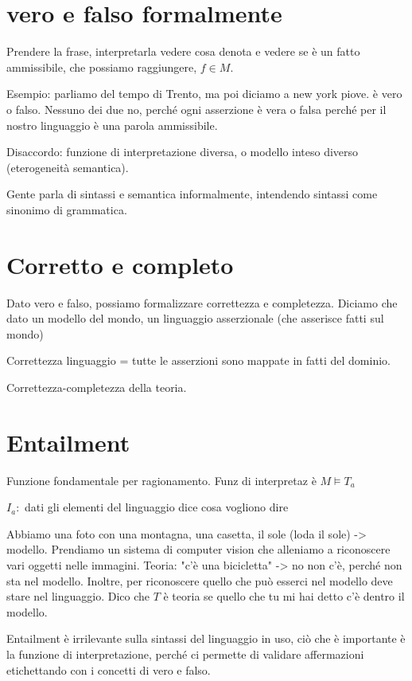 \section{vero e falso formalmente}
Prendere la frase, interpretarla vedere cosa denota e vedere se è un fatto
ammissibile, che possiamo raggiungere, $f \in M$.



Esempio: parliamo del tempo di Trento, ma poi diciamo a new york piove. è vero
o falso. Nessuno dei due no, perché ogni asserzione è vera o falsa perché per
il nostro linguaggio è una parola ammissibile.

Disaccordo: funzione di interpretazione diversa, o modello inteso diverso
(eterogeneità semantica).


Gente parla di sintassi e semantica informalmente, intendendo sintassi
come sinonimo di grammatica.

\section{Corretto e completo}
Dato vero e falso, possiamo formalizzare correttezza e completezza.
Diciamo che dato un modello del mondo, un linguaggio asserzionale (che asserisce fatti sul mondo)

Correttezza linguaggio = tutte le asserzioni sono mappate in fatti del dominio.


Correttezza-completezza della teoria.


\section{Entailment}
Funzione fondamentale per ragionamento. Funz di interpretaz è $M \vDash T_a$

$I_a:$ dati gli elementi del linguaggio dice cosa vogliono dire


Abbiamo una foto con una montagna, una casetta, il sole (loda il sole) -> modello.
Prendiamo un sistema di computer vision che alleniamo a riconoscere
vari oggetti nelle immagini.
Teoria: "c'è una bicicletta" -> no non c'è, perché non sta nel modello.
Inoltre, per riconoscere quello che può esserci nel modello deve stare
nel linguaggio. Dico che $T$ è teoria se quello che tu mi hai detto c'è dentro il
modello.

Entailment è irrilevante sulla sintassi del linguaggio in uso, ciò che è
importante è la funzione di interpretazione, perché ci permette di validare
affermazioni etichettando con i concetti di vero e falso.


